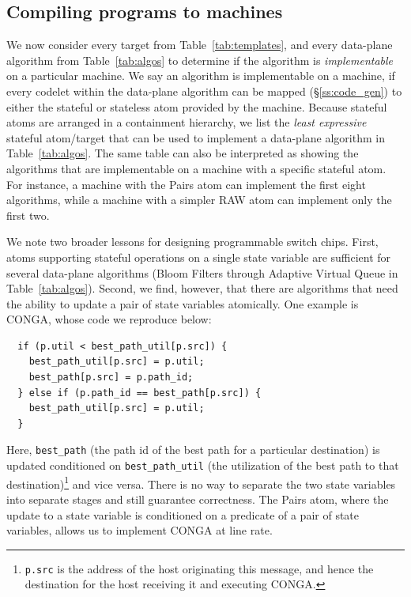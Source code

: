 
\subsection{Compiling \pktlanguage programs to \absmachine machines}

We now consider every target from Table~\ref{tab:templates}, and every
data-plane algorithm from Table~\ref{tab:algos} to determine if the algorithm
is \textit{implementable} on a particular \absmachine machine. We say an
algorithm is implementable on a \absmachine machine, if every codelet within
the data-plane algorithm can be mapped (\S\ref{ss:code_gen}) to either the
stateful or stateless atom provided by the \absmachine machine. Because
stateful atoms are arranged in a containment hierarchy, we list the
\textit{least expressive} stateful atom/target that can be used to implement a
data-plane algorithm in Table~\ref{tab:algos}. The same table can also be
interpreted as showing the algorithms that are implementable on a \absmachine
machine with a specific stateful atom. For instance, a \absmachine machine with
the Pairs atom can implement the first eight algorithms, while a machine with a
simpler RAW atom can implement only the first two.

We note two broader lessons for designing programmable switch chips.  First,
atoms supporting stateful operations on a single state variable are sufficient
for several data-plane algorithms (Bloom Filters through Adaptive Virtual Queue
in Table~\ref{tab:algos}). Second, we find, however, that there are algorithms
that need the ability to update a pair of state variables atomically. One
example is CONGA, whose code we reproduce below:
\begin{verbatim}
  if (p.util < best_path_util[p.src]) {
    best_path_util[p.src] = p.util;
    best_path[p.src] = p.path_id;
  } else if (p.path_id == best_path[p.src]) {
    best_path_util[p.src] = p.util;
  }
\end{verbatim}
Here, \texttt{best\_path} (the path id of the best path for a particular
destination) is updated conditioned on \texttt{best\_path\_util} (the
utilization of the best path to that destination)\footnote{{\tt p.src} is the
  address of the host originating this message, and hence the destination for
the host receiving it and executing CONGA.} and vice versa. There is no way to
separate the two state variables into separate stages and still guarantee
correctness. The Pairs atom, where the update to a state variable is conditioned
on a predicate of a pair of state variables, allows us to implement CONGA at
line rate.

